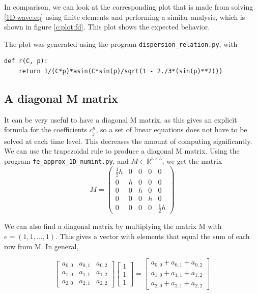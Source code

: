\documentclass[twoside]{article}
\begin{document}
In comparison, we can look at the corresponding plot that is made from solving \eqref{1D:wave:eq} using finite elements and performing a similar analysis, which is shown in figure \ref{c:plot:fd}. This plot shows the expected behavior.

The plot was generated using the program \texttt{dispersion\_relation.py}, with
\begin{verbatim}
def r(C, p):
    return 1/(C*p)*asin(C*sin(p)/sqrt(1 - 2./3*(sin(p)**2)))  
\end{verbatim}


\subsection{A diagonal M matrix}

It can be very useful to have a diagonal M matrix, as this gives an explicit formula for the coefficients $c_j^n$, so a set of linear equations does not have to be solved at each time level. This decreases the amount of computing significantly.
We can use the trapezoidal rule to produce a diagonal M matrix. Using the program \texttt{fe\_approx\_1D\_numint.py}, and $M\in\mathbb{R}^{5\times5}$, we get the matrix
\begin{equation}
M = \left(\begin{matrix}
\frac{1}{2} h & 0 & 0 & 0 & 0\\
0 & h & 0 & 0 & 0\\
0 & 0 & h & 0 & 0\\
0 & 0 & 0 & h & 0\\
0 & 0 & 0 & 0 & \frac{1}{2} h
\end{matrix}\right)
\end{equation}

We can also find a diagonal matrix by multiplying the matrix M with $e = (1, 1, \hdots, 1)$. This gives a vector with elements that equal the sum of each row from M. In general,

\begin{equation*}
\left[\begin{matrix}
a_{0,0} & a_{0,1} & a_{0,2}\\
a_{1,0} & a_{1,1} & a_{1,2}\\
a_{2,0} & a_{2,1} & a_{2,2}
\end{matrix}\right]
\left[\begin{matrix}
1 \\
1 \\
1
\end{matrix}\right]
 = 
 \left[\begin{matrix}
a_{0,0} + a_{0,1} + a_{0,2} \\
a_{1,0} + a_{1,1} + a_{1,2}\\
a_{2,0} + a_{2,1} + a_{2,2}
\label{def:m:by:ones}
\end{matrix}\right]
\end{equation*}
\end{document}
